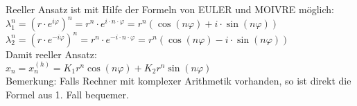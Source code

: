 Reeller Ansatz ist mit Hilfe der Formeln von EULER und MOIVRE möglich:\\
$\lambda_1^n= \left(r\cdot e^{i\varphi}\right)^n = r^n \cdot e^{i\cdot n \cdot \varphi} = r^n(\cos(n\varphi)+i\cdot \sin(n\varphi))$\\
$\lambda_2^n= \left(r\cdot e^{-i\varphi}\right)^n = r^n \cdot e^{-i\cdot n \cdot \varphi} = r^n(\cos(n\varphi)-i\cdot \sin(n\varphi))$\\
Damit reeller Ansatz:\\
$x_n=x_n^{(h)}=K_1 r^n \cos(n\varphi)+K_2 r^n \sin(n \varphi)$\\
Bemerkung: Falls Rechner mit komplexer Arithmetik vorhanden, so ist direkt die Formel aus 1. Fall bequemer.